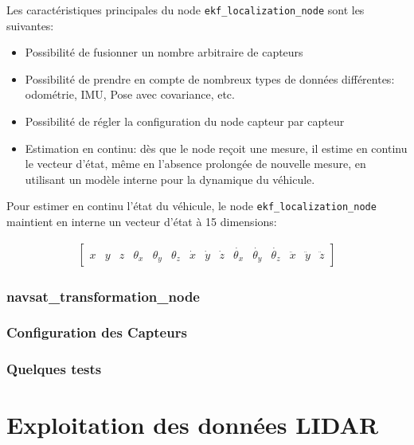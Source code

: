 \documentclass[12pt,a4paper]{report}
\begin{document}
	\para Les caractéristiques principales du node \verb|ekf_localization_node| sont les suivantes:
	\begin{itemize}
		\item Possibilité de fusionner un nombre arbitraire de capteurs
		\item Possibilité de prendre en compte de nombreux types de données différentes: odométrie, IMU, Pose avec covariance, etc.
		\item Possibilité de régler la configuration du node capteur par capteur
		\item Estimation en continu: dès que le node reçoit une mesure, il estime en continu le vecteur d'état, même en l'absence prolongée de nouvelle mesure, en utilisant un modèle interne pour la dynamique du véhicule.
	\end{itemize}

	\para Pour estimer en continu l'état du véhicule, le node \verb|ekf_localization_node| maintient en interne un vecteur d'état à 15 dimensions:
	
	\begin{gather}
		\begin{bmatrix}
			x&y&z&\theta_x&\theta_y&\theta_z&
			\dot{x}&\dot{y}&\dot{z}&\dot{\theta_x}&\dot{\theta_y}&\dot{\theta_z} &\ddot{x}&\ddot{y}&\ddot{z}
		\end{bmatrix}
	\end{gather}
	
	\subsection{navsat\_transformation\_node}
	
	\subsection{Configuration des Capteurs}
	
	\subsection{Quelques tests}
	
	
\chapter{Exploitation des données LIDAR}
\end{document}
